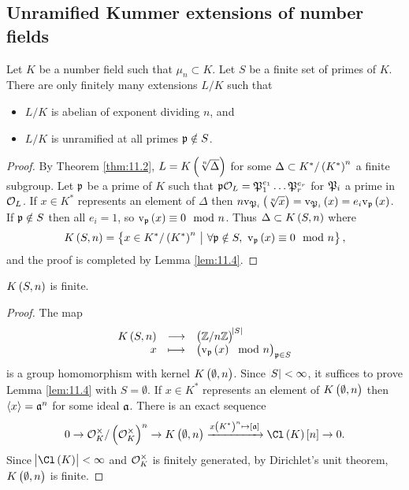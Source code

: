 \subsection{Unramified Kummer extensions of number fields}


\begin{proposition}
\label{prop:11.3}
Let $ K $ be a number field such that $ \mu_n \subset K $. Let $ S $ be a finite set of primes of $ K $. There are only finitely many extensions $ L / K $ such that
\begin{itemize}
\item $ L / K $ is abelian of exponent dividing $ n $, and
\item $ L / K $ is unramified at all primes $ \mathfrak{p} \notin S $.
\end{itemize}
\end{proposition}

\begin{proof}
By Theorem \ref{thm:11.2}, $ L = K\br{\sqrt[n]{\Delta}} $ for some $ \Delta \subset K^* / \br{K^*}^n $ a finite subgroup. Let $ \mathfrak{p} $ be a prime of $ K $ such that $ \mathfrak{p}\mathcal{O}_L = \mathfrak{P}_1^{e_1} \dots \mathfrak{P}_r^{e_r} $ for $ \mathfrak{P}_i $ a prime in $ \mathcal{O}_L $. If $ x \in K^* $ represents an element of $ \Delta $ then $ n\v_{\pp_i}\br{\sqrt[n]{x}} = \v_{\pp_i}\br{x} = e_i\v_\ppp\br{x} $. If $ \mathfrak{p} \notin S $ then all $ e_i = 1 $, so $ \v_\ppp\br{x} \equiv 0 \mod n $. Thus $ \Delta \subset K\br{S, n} $ where
$$ K\br{S, n} = \cbr{x \in K^* / \br{K^*}^n \st \forall \ppp \notin S, \ \v_\ppp\br{x} \equiv 0 \mod n}, $$
and the proof is completed by Lemma \ref{lem:11.4}.
\end{proof}

\begin{lemma}
\label{lem:11.4}
$ K\br{S, n} $ is finite.
\end{lemma}

\begin{proof}
The map
$$ \function{K\br{S, n}}{\br{\ZZ / n\ZZ}^{\abs{S}}}{x}{\br{\v_\ppp\br{x} \mod n}_{\ppp \in S}} $$
is a group homomorphism with kernel $ K\br{\emptyset, n} $. Since $ \abs{S} < \infty $, it suffices to prove Lemma \ref{lem:11.4} with $ S = \emptyset $. If $ x \in K^* $ represents an element of $ K\br{\emptyset, n} $ then $ \left\langle x \right\rangle = \mathfrak{a}^n $ for some ideal $ \mathfrak{a} $. There is an exact sequence
$$ 0 \to \OOO_K^\times / \br{\OOO_K^\times}^n \to K\br{\emptyset, n} \xrightarrow{x\br{K^*}^n \mapsto \sbr{\aaa}} \Cl\br{K}\sbr{n} \to 0. $$
Since $ \abs{\Cl\br{K}} < \infty $ and $ \mathcal{O}_K^\times $ is finitely generated, by Dirichlet's unit theorem, $ K\br{\emptyset, n} $ is finite.
\end{proof}

